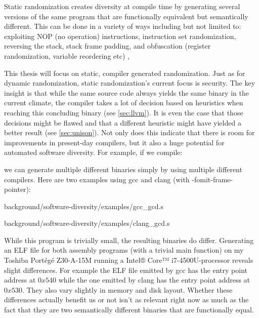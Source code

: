 Static randomization creates diversity at compile time by generating several versions of the
same program that are functionally equivalent but semantically different. This can be done
in a variety of ways including but not limited to: exploiting NOP (no operation) instructions,
instruction set randomization, reversing the stack, stack frame padding,
and obfuscation (register randomization, variable reordering etc)
\cite{survey, compiler-generated-sw-div},

This thesis will focus on static, compiler generated randomization. Just as for dynamic
randomization, static randomization's current focus is security. The key insight is that
while the same source code always yields the same binary in the current climate, the compiler
takes a lot of decision based on heuristics when reaching this concluding binary (see \ref{sec:llvm}).
It is even the case that those decisions might be flawed and that a different heuristic
might have yielded a better result (see \ref{sec:unison}). Not only does this indicate
that there is room for improvements in present-day compilers, but it also a huge potential
for automated software diversity. For example, if we compile:



we can generate multiple different binaries simply by using multiple different compilers.
Here are two examples using gcc and clang (with -fomit-frame-pointer):


{background/software-diversity/examples/gcc_gcd.s}


{background/software-diversity/examples/clang_gcd.s}

While this program is trivially small, the resulting binaries do differ. Generating an
ELF file for both assembly programs (with a trivial main function) on my Toshiba Portégé
Z30-A-15M running a Intel® Core™ i7-4500U-processor reveals slight differences. For example
the ELF file emitted by gcc has the entry point address at $0x540$ while the one emitted
by clang has the entry point address at $0x530$. They also vary slightly in memory and
disk layout. Whether these differences actually benefit us or not isn't as relevant right now
as much as the fact that they are two semantically different binaries that are functionally equal.

